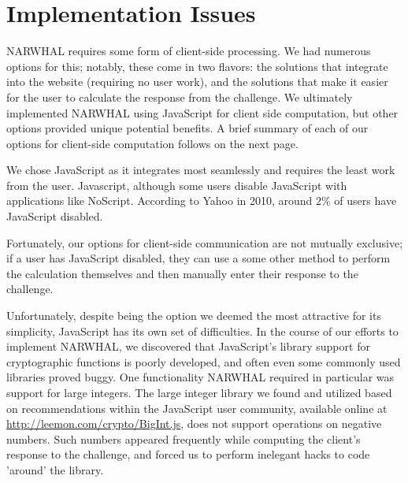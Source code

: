 \documentclass[11pt]{article}
\begin{document}
\section{Implementation Issues}
NARWHAL requires some form of client-side processing. We had numerous options for this; notably, these come in two flavors: the solutions that integrate into the website (requiring no user work), and the solutions that make it easier for the user to calculate the response from the challenge. We ultimately implemented NARWHAL using JavaScript for client side computation, but other options provided unique potential benefits. A brief summary of each of our options for client-side computation follows on the next page.

We chose JavaScript as it integrates most seamlessly and requires the least work from the user. Javascript, although some users disable JavaScript with applications like NoScript. According to Yahoo in 2010, around $2\%$ of users have JavaScript disabled. \cite{Zakas}

Fortunately, our options for client-side communication are not mutually exclusive; if a user has JavaScript disabled, they can use a some other method to perform the calculation themselves and then manually enter their response to the challenge.

Unfortunately, despite being the option we deemed the most attractive for its simplicity, JavaScript has its own set of difficulties.  In the course of our efforts to implement NARWHAL, we discovered that JavaScript's library support for cryptographic functions is poorly developed, and often even some commonly used libraries proved buggy.  One functionality NARWHAL required in particular was support for large integers.  The large integer library we found and utilized based on recommendations within the JavaScript user community, available online at \url{http://leemon.com/crypto/BigInt.js}, does not support operations on negative numbers.  Such numbers appeared frequently while computing the client's response to the challenge, and forced us to perform inelegant hacks to code 'around' the library.
\end{document}
